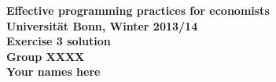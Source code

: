 \documentclass[11pt,a4paper,leqno]{article}
\theoremstyle{definition}
\begin{document}
\begin{center}
    \begin{large}
        \textbf{
        Effective programming practices for economists\\
        Universität Bonn, Winter 2013/14 \\[2ex]
        Exercise 3 solution\\[2ex]
        Group XXXX\\[2ex]
        Your names here
        }
    \end{large}
\end{center}

	



\end{document}
